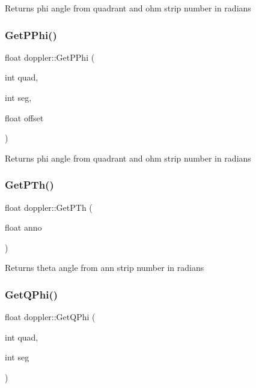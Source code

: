 Returns phi angle from quadrant and ohm strip number in radians \mbox{\label{classdoppler_ac8f059cc77214a954be534a85c748a3c}} 
\subsubsection{\texorpdfstring{Get\+P\+Phi()}{GetPPhi()}\hspace{0.1cm}{\footnotesize\ttfamily [2/2]}}
{\footnotesize\ttfamily float doppler\+::\+Get\+P\+Phi (\begin{DoxyParamCaption}\item[{int}]{quad,  }\item[{int}]{seg,  }\item[{float}]{offset }\end{DoxyParamCaption})}

Returns phi angle from quadrant and ohm strip number in radians \mbox{\label{classdoppler_a1415bdb47dbb9d5eba7f14a64bd3693e}} 
\subsubsection{\texorpdfstring{Get\+P\+Th()}{GetPTh()}}
{\footnotesize\ttfamily float doppler\+::\+Get\+P\+Th (\begin{DoxyParamCaption}\item[{float}]{anno }\end{DoxyParamCaption})}

Returns theta angle from ann strip number in radians \mbox{\label{classdoppler_a7c3afd05ed9ddb8c5bedc0de905acd0b}} 
\subsubsection{\texorpdfstring{Get\+Q\+Phi()}{GetQPhi()}}
{\footnotesize\ttfamily float doppler\+::\+Get\+Q\+Phi (\begin{DoxyParamCaption}\item[{int}]{quad,  }\item[{int}]{seg }\end{DoxyParamCaption})}

